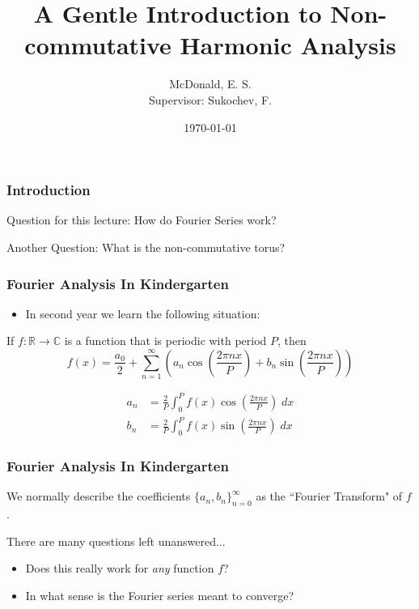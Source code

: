 \documentclass{beamer}
\title[Harmonic Analysis]{A Gentle Introduction to Non-commutative Harmonic Analysis}
\author[McDonald, E.]{McDonald, E. S. \\Supervisor: Sukochev, F.}
\institute[UNSW] { UNSW Australia }
\date{\today}
\newcommand{\Rl}{\mathbb{R}}
\newcommand{\Cplx}{\mathbb{C}}
\begin{document}
\begin{frame}
\titlepage
\end{frame} %
\begin{frame}
\frametitle{Introduction}
    \begin{block}
            {Question for this lecture:}
                How do Fourier Series work?
        \end{block}
    \begin{block}
            {Another Question:}
                What is the non-commutative torus?
    \end{block}
\end{frame}

\begin{frame}
    \frametitle{Fourier Analysis In Kindergarten}
    \begin{itemize}
        \item{} In second year we learn the following situation:
    \end{itemize}
    \begin{definition}
        If $f:\Rl\rightarrow\Cplx$ is a function that is periodic with period $P$, then
        \begin{equation*}
            f(x) = \frac{a_0}{2}+\sum_{n=1}^\infty \left(a_n \cos\left(\frac{2\pi n x}{P}\right)+b_n\sin\left(\frac{2\pi n x}{P}\right)\right)
        \end{equation*}
    \end{definition}
    \begin{definition}
        \begin{align*}
            a_n &= \frac{2}{P}\int_{0}^P f(x) \cos\left(\frac{2\pi n x}{P}\right)\;dx\\
            b_n &= \frac{2}{P}\int_{0}^P f(x) \sin\left(\frac{2\pi n x}{P}\right)\;dx
        \end{align*}
    \end{definition}
\end{frame}

\begin{frame}
    \frametitle{Fourier Analysis In Kindergarten}
        We normally describe the coefficients $\{a_n,b_n\}_{n=0}^\infty$
        as the ``Fourier Transform" of $f$.
        
    
        There are many questions left unanswered...
        \begin{itemize}
            \item{} Does this really work for \emph{any} function $f$?
            \item{} In what sense is the Fourier series meant to converge?
        \end{itemize}
\end{frame}
\end{document}
